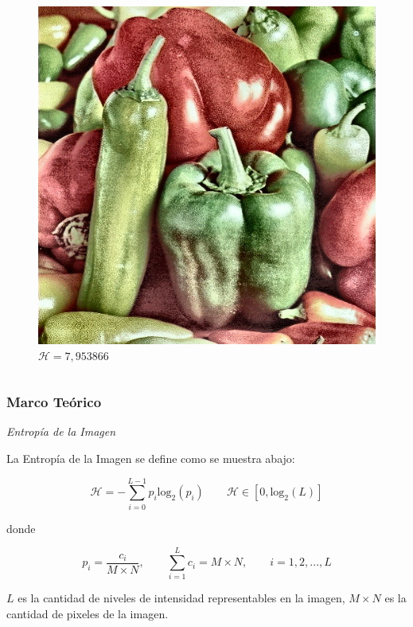 \documentclass[usenames,dvipsnames]{beamer}
\begin{document}
\begin{frame}
\begin{columns}[onlytextwidth]
\begin{column}{.45\textwidth}
\begin{figure}
		  \includegraphics[width=\textwidth]{graphics/peppers_color_hc.jpg}
		  \caption{$\mathscr{H}=7,953866$}
		\end{figure}
\end{column}
\end{columns}


\end{frame}


\begin{frame} 
\frametitle{Marco Teórico} 
\begin{exampleblock}{\textit{Entropía de la Imagen}}

La Entropía de la Imagen se define como se muestra abajo:

\end{exampleblock}

\begin{equation}
\mathscr{H}= -\sum_{i=0}^{L-1} p_i \text{log}_2(p_i) \qquad \mathscr{H} \in [0,\text{log}_2(L)]
\end{equation}

donde

\begin{equation}
p_i=\frac{c_i}{M \times N}, \qquad \sum_{i=1}^L c_i = M \times N, \qquad i= 1,2, ..., L
\end{equation}

$L$ es la cantidad de niveles de intensidad representables en la imagen, $M \times N$ es la cantidad de pixeles de la imagen.

\end{frame}    
\end{document}
